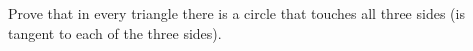Prove that in every triangle there is a circle that touches all three sides (is tangent to each of the three sides).
